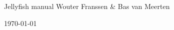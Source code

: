%
%
%
%

\begin{titlepage}
\begin{center}




{\Huge Jellyfish manual}
\vfill
\large Wouter Franssen \& Bas van Meerten

\vspace{1cm}
\vfill

\vfill
\vfill
{\large \today}

\end{center}

\end{titlepage}
